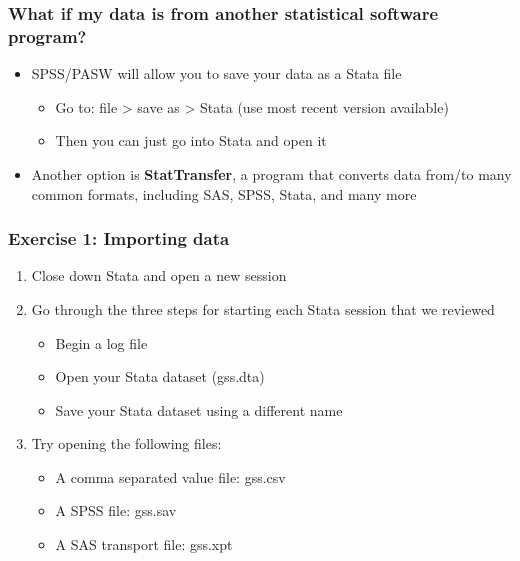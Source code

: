 \documentclass[table]{beamer}
\begin{document}
\begin{frame}
\frametitle{What if my data is from another statistical software program?}
\label{sec-2-5}

\begin{itemize}
\item SPSS/PASW will allow you to save your data as a Stata file
\begin{itemize}
\item Go to: file > save as > Stata (use most   recent version available)
\item Then you can just go into Stata and   open it
\end{itemize}
\item Another option is \textbf{StatTransfer}, a program that converts data from/to many common formats, including SAS, SPSS, Stata, and many more
\end{itemize}
\end{frame}
\begin{frame}
\frametitle{Exercise 1: Importing data}
\label{sec-2-6}

\begin{enumerate}
\item Close down Stata and open a new session
\item Go through the three steps for starting each Stata  session that we reviewed
\begin{itemize}
\item Begin a log file
\item Open your Stata dataset (gss.dta)
\item Save your Stata dataset using a different name
\end{itemize}
\item Try opening the following files:
\begin{itemize}
\item A comma separated value file: gss.csv
\item A SPSS file: gss.sav
\item A SAS transport file: gss.xpt
\end{itemize}
\end{enumerate}
\end{frame}
\end{document}
